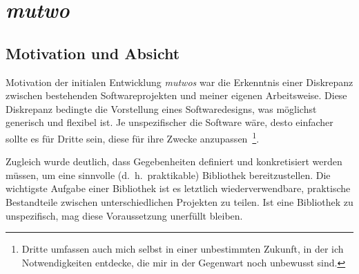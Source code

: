 \documentclass[12pt,a4paper,ngerman]{article}
\begin{document}




\section{\emph{mutwo}}

\subsection{Motivation und Absicht}
\label{motivationUndAbsicht}

Motivation der initialen Entwicklung \emph{mutwos} war die Erkenntnis einer Diskrepanz zwischen bestehenden Softwareprojekten und meiner eigenen Arbeitsweise.
Diese Diskrepanz bedingte die Vorstellung eines Softwaredesigns, was möglichst generisch und flexibel ist.
Je unspezifischer die Software wäre, desto einfacher sollte es für Dritte sein, diese für ihre Zwecke anzupassen~\footnote{%
    Dritte umfassen auch mich selbst in einer unbestimmten Zukunft, in der ich Notwendigkeiten entdecke, die mir in der Gegenwart noch unbewusst sind.%
}.

\smallskip

Zugleich wurde deutlich, dass Gegebenheiten definiert und konkretisiert werden müssen, um eine sinnvolle (d.~h.\ praktikable) Bibliothek bereitzustellen.
Die wichtigste Aufgabe einer Bibliothek ist es letztlich wiederverwendbare, praktische Bestandteile zwischen unterschiedlichen Projekten zu teilen.
Ist eine Bibliothek zu unspezifisch, mag diese Voraussetzung unerfüllt bleiben.
\end{document}
